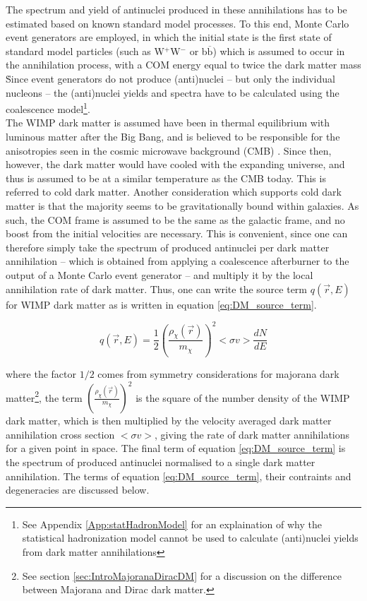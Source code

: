 The spectrum and yield of antinuclei produced in these annihilations has to be estimated based on known standard model processes. To this end, Monte Carlo event generators are employed\cite{}, in which the initial state is the first state of standard model particles (such as W$^+$W$^-$ or b$\overline{\mathrm{b}}$) which is assumed to occur in the annihilation process, with a COM energy equal to twice the dark matter mass \dmm\. Since event generators do not produce (anti)nuclei -- but only the individual nucleons -- the (anti)nuclei yields and spectra have to be calculated using the coalescence model\footnote{See Appendix \ref{App:statHadronModel} for an explaination of why the statistical hadronization model cannot be used to calculate (anti)nuclei yields from dark matter annihilations}.  \\ 

The WIMP dark matter is assumed have been in thermal equilibrium with luminous matter after the Big Bang, and is believed to be responsible for the anisotropies seen in the cosmic microwave background (CMB) \cite{}. Since then, however, the dark matter would have cooled with the expanding universe, and thus is assumed to be at a similar temperature as the CMB today. This is referred to cold dark matter. Another consideration which supports cold dark matter is that the majority seems to be gravitationally bound within galaxies. As such, the COM frame is assumed to be the same as the galactic frame, and no boost from the initial velocities are necessary. This is convenient, since one can therefore simply take the spectrum of produced antinuclei per dark matter annihilation -- which is obtained from applying a coalescence afterburner to the output of a Monte Carlo event generator -- and multiply it by the local annihilation rate of dark matter. Thus, one can write the source term $q(\vec{r}, E)$ for WIMP dark matter as is written in equation \ref{eq:DM_source_term}. 

\begin{equation}\label{eq:DM_source_term}
    q(\vec{r}, E) = \frac{1}{2} \left( \frac{\rho_{\chi}(\vec{r})}{m_\chi}\right)^2 <\sigma v > \frac{dN}{dE}
\end{equation}

where the factor $1/2$ comes from symmetry considerations for majorana dark matter\footnote{See section \ref{sec:IntroMajoranaDiracDM} for a discussion on the difference between Majorana and Dirac dark matter.}, the term $\left( \frac{\rho_{\chi}(\vec{r})}{m_\chi}\right)^2$ is the square of the number density of the WIMP dark matter, which is then multiplied by the velocity averaged dark matter annihilation cross section $<\sigma v>$, giving the rate of dark matter annihilations for a given point in space. The final term of equation \ref{eq:DM_source_term} is the spectrum of produced antinuclei normalised to a single dark matter annihilation. The terms of equation \ref{eq:DM_source_term}, their contraints and degeneracies are discussed below.\\

